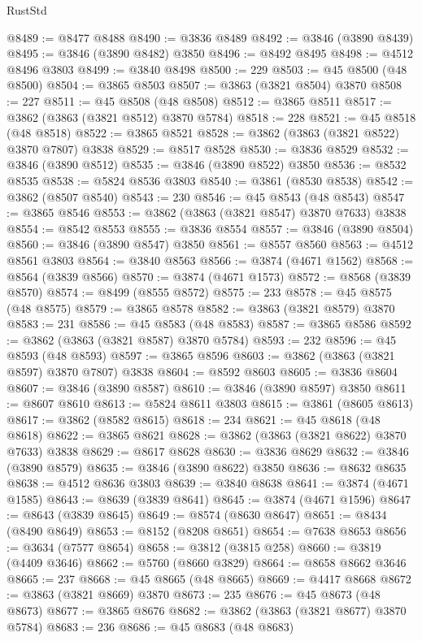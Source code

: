 \begin{lexlean}{RustStd}
\begin{coremodule}
@8489 := @8477 @8488
@8490 := @3836 @8489
@8492 := @3846 (@3890 @8439)
@8495 := @3846 (@3890 @8482) @3850
@8496 := @8492 @8495
@8498 := @4512 @8496 @3803
@8499 := @3840 @8498
@8500 := 229
@8503 := @45 @8500 (@48 @8500)
@8504 := @3865 @8503
@8507 := @3863 (@3821 @8504) @3870
@8508 := 227
@8511 := @45 @8508 (@48 @8508)
@8512 := @3865 @8511
@8517 := @3862 (@3863 (@3821 @8512) @3870 @5784)
@8518 := 228
@8521 := @45 @8518 (@48 @8518)
@8522 := @3865 @8521
@8528 := @3862 (@3863 (@3821 @8522) @3870 @7807) @3838
@8529 := @8517 @8528
@8530 := @3836 @8529
@8532 := @3846 (@3890 @8512)
@8535 := @3846 (@3890 @8522) @3850
@8536 := @8532 @8535
@8538 := @5824 @8536 @3803
@8540 := @3861 (@8530 @8538)
@8542 := @3862 (@8507 @8540)
@8543 := 230
@8546 := @45 @8543 (@48 @8543)
@8547 := @3865 @8546
@8553 := @3862 (@3863 (@3821 @8547) @3870 @7633) @3838
@8554 := @8542 @8553
@8555 := @3836 @8554
@8557 := @3846 (@3890 @8504)
@8560 := @3846 (@3890 @8547) @3850
@8561 := @8557 @8560
@8563 := @4512 @8561 @3803
@8564 := @3840 @8563
@8566 := @3874 (@4671 @1562)
@8568 := @8564 (@3839 @8566)
@8570 := @3874 (@4671 @1573)
@8572 := @8568 (@3839 @8570)
@8574 := @8499 (@8555 @8572)
@8575 := 233
@8578 := @45 @8575 (@48 @8575)
@8579 := @3865 @8578
@8582 := @3863 (@3821 @8579) @3870
@8583 := 231
@8586 := @45 @8583 (@48 @8583)
@8587 := @3865 @8586
@8592 := @3862 (@3863 (@3821 @8587) @3870 @5784)
@8593 := 232
@8596 := @45 @8593 (@48 @8593)
@8597 := @3865 @8596
@8603 := @3862 (@3863 (@3821 @8597) @3870 @7807) @3838
@8604 := @8592 @8603
@8605 := @3836 @8604
@8607 := @3846 (@3890 @8587)
@8610 := @3846 (@3890 @8597) @3850
@8611 := @8607 @8610
@8613 := @5824 @8611 @3803
@8615 := @3861 (@8605 @8613)
@8617 := @3862 (@8582 @8615)
@8618 := 234
@8621 := @45 @8618 (@48 @8618)
@8622 := @3865 @8621
@8628 := @3862 (@3863 (@3821 @8622) @3870 @7633) @3838
@8629 := @8617 @8628
@8630 := @3836 @8629
@8632 := @3846 (@3890 @8579)
@8635 := @3846 (@3890 @8622) @3850
@8636 := @8632 @8635
@8638 := @4512 @8636 @3803
@8639 := @3840 @8638
@8641 := @3874 (@4671 @1585)
@8643 := @8639 (@3839 @8641)
@8645 := @3874 (@4671 @1596)
@8647 := @8643 (@3839 @8645)
@8649 := @8574 (@8630 @8647)
@8651 := @8434 (@8490 @8649)
@8653 := @8152 (@8208 @8651)
@8654 := @7638 @8653
@8656 := @3634 (@7577 @8654)
@8658 := @3812 (@3815 @258)
@8660 := @3819 (@4409 @3646)
@8662 := @5760 (@8660 @3829)
@8664 := @8658 @8662 @3646
@8665 := 237
@8668 := @45 @8665 (@48 @8665)
@8669 := @4417 @8668
@8672 := @3863 (@3821 @8669) @3870
@8673 := 235
@8676 := @45 @8673 (@48 @8673)
@8677 := @3865 @8676
@8682 := @3862 (@3863 (@3821 @8677) @3870 @5784)
@8683 := 236
@8686 := @45 @8683 (@48 @8683)

\end{coremodule}
\end{lexlean}
